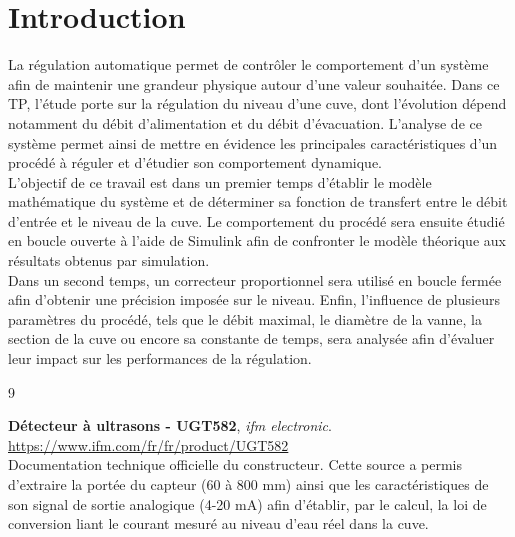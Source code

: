 \documentclass[12pt,a4paper]{article}
\begin{document}
\clearpage
{}


\section*{Introduction}

\vspace{2cm}

\hspace*{0.5cm} La régulation automatique permet de contrôler le comportement d’un système afin de maintenir une grandeur physique autour d’une valeur souhaitée. Dans ce TP, l’étude porte sur la régulation du niveau d’une cuve, dont l’évolution dépend notamment du débit d’alimentation et du débit d’évacuation. L’analyse de ce système permet ainsi de mettre en évidence les principales caractéristiques d’un procédé à réguler et d’étudier son comportement dynamique.\\

\hspace*{0.5cm} L’objectif de ce travail est dans un premier temps d’établir le modèle mathématique du système et de déterminer sa fonction de transfert entre le débit d’entrée et le niveau de la cuve. Le comportement du procédé sera ensuite étudié en boucle ouverte à l’aide de Simulink afin de confronter le modèle théorique aux résultats obtenus par simulation.\\

\hspace*{0.5cm} Dans un second temps, un correcteur proportionnel sera utilisé en boucle fermée afin d’obtenir une précision imposée sur le niveau. Enfin, l’influence de plusieurs paramètres du procédé, tels que le débit maximal, le diamètre de la vanne, la section de la cuve ou encore sa constante de temps, sera analysée afin d’évaluer leur impact sur les performances de la régulation.

\clearpage
\begin{thebibliography}{9}

\textbf{Détecteur à ultrasons - UGT582}, \textit{ifm electronic}.\\
\url{https://www.ifm.com/fr/fr/product/UGT582}\\
\small{Documentation technique officielle du constructeur. Cette source a permis d'extraire la portée du capteur (60 à 800 mm) ainsi que les caractéristiques de son signal de sortie analogique (4-20 mA) afin d'établir, par le calcul, la loi de conversion liant le courant mesuré au niveau d'eau réel dans la cuve.}

\end{thebibliography}


\listoffigures
\cleardoublepage
\end{document}
